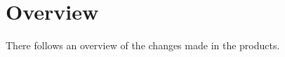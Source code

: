 \chapter{Overview}
\label{chp:overview}

There follows an overview of the changes made in the products.
